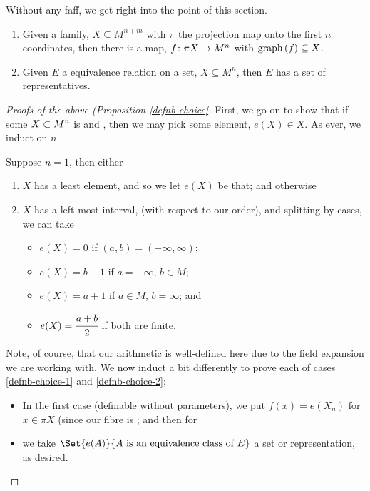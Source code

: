 Without any faff, we get right into the point of this section.
 \begin{proposition}
  \label{defnb-choice}
  \begin{enumerate}
    \item \label{defnb-choice-1} Given a  family, $X \subseteq M^{n+m}$ with $\pi$ the projection map onto the first $n$ coordinates, then there is a  map, $\funcdom{f}{\pi X}{M^n}$ with $\graph{f} \subseteq X$.
    \item \label{defnb-choice-2} Given $E$ a  equivalence relation on a  set, $X \subseteq M^n$, then $E$ has a set of representatives.
  \end{enumerate}

\end{proposition}
\begin{proof}[Proofs of the above (Proposition \ref{defnb-choice}]
  First, we go on to show that if some $\XsubsetMn[n]$ is  and \inhb, then we may  pick some element, $e(X) \in X$. As ever, we induct on $n$. 
  
  Suppose $n=1$, then either
  \begin{enumerate}
    \item $X$ has a least element, and so we let $e(X)$ be that; and otherwise
    \item $X$ has a left-most interval, (with respect to our order), and splitting by cases, we can take
      \begin{itemize}
        \item $e(X) = 0$ if $(a, b) = (- \infty, \infty)$;
        \item $e(X) = b - 1$ if $a = - \infty$, $b \in M$;
        \item $e(X) = a + 1$ if $a \in M$, $b = \infty$; and
        \item $e(X) = \cfrac{a + b}{2}$ if both are finite.
      \end{itemize}
  \end{enumerate}
  Note, of course, that our arithmetic is well-defined here due to the field expansion we are working with. We now induct a bit differently to prove each of cases \ref{defnb-choice-1} and \ref{defnb-choice-2};
  
  \begin{itemize}
    \item In the first case (definable without parameters), we put $f(x) = e(X_n)$ for $x \in \pi X$ (since our fibre is \inhb; and then for 
    \item we take $\Set{e(A)}{A \ \textrm{is an equivalence class of} \ E}$ a  set or representation, as desired.
  \end{itemize}
\end{proof}


